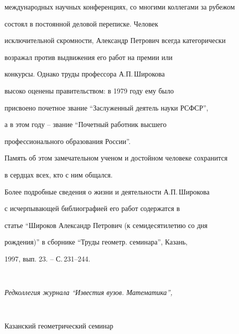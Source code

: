 международных научных конференциях, со многими коллегами за рубежом

состоял в постоянной деловой переписке. Человек

исключительной скромности, Александр Петрович всегда категорически

возражал против выдвижения его работ на премии или

конкурсы. Однако труды профессора А.П.\,Широкова

высоко оценены правительством: в 1979 году ему было

присвоено почетное звание ``Заслуженный деятель науки РСФСР'',

а в этом году -- звание ``Почетный работник высшего

профессионального образования России''.

Память об этом замечательном ученом и достойном человеке сохранится

в сердцах всех, кто с ним общался.



Более подробные сведения о жизни и деятельности А.П.\,Широкова

с исчерпывающей библиографией его работ содержатся в

статье ``Широков Александр Петрович (к семидесятилетию со дня

рождения)'' в сборнике ``Труды геометр. семинара'', Казань,

1997, вып. 23. -- С.\,231--244.

\bigskip

\bigskip



$\qquad\qquad\qquad\qquad\qquad\qquad$

\it Редколлегия журнала ``Известия вузов. Математика'',



$\qquad\qquad\qquad\qquad\qquad\qquad$

 Казанский геометрический семинар





